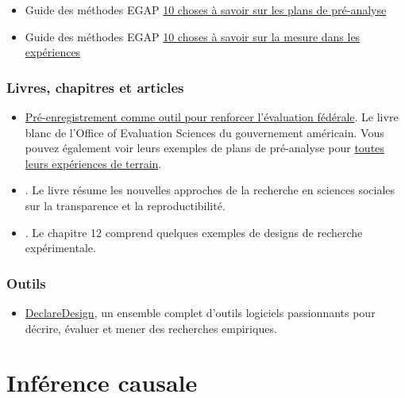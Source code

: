 \documentclass[
  12pt,
]{book}
\providecommand{\tightlist}{%
  \setlength{\itemsep}{0pt}\setlength{\parskip}{0pt}}
\begin{document}
\begin{itemize}
\item
  Guide des méthodes EGAP \href{https://egap.org/resource/10-things-to-know-about-pre-analysis-plans/}{10 choses à savoir sur les plans de pré-analyse}
\item
  Guide des méthodes EGAP \href{https://egap.org/resource/10-things-to-know-about-measurement-in-experiments/}{10 choses à savoir sur la mesure dans les expériences}
\end{itemize}

\hypertarget{livres-chapitres-et-articles}{%
\subsection{Livres, chapitres et articles}\label{livres-chapitres-et-articles}}

\begin{itemize}
\item
  \href{https://oes.gsa.gov/assets/files/preregistration-as-a-tool-in-federal-evaluation.pdf}{Pré-enregistrement comme outil pour renforcer l'évaluation fédérale}. Le livre blanc de l'Office of Evaluation Sciences du gouvernement américain. Vous pouvez également voir leurs exemples de plans de pré-analyse pour \href{https://oes.gsa.gov/work/}{toutes leurs expériences de terrain}.
\item
  \autocite{christensen_transparent_2019}. Le livre résume les nouvelles approches de la recherche en sciences sociales sur la transparence et la reproductibilité.
\item
  \autocite{gerber_field_2012}. Le chapitre 12 comprend quelques exemples de designs de recherche expérimentale.
\end{itemize}

\hypertarget{outils}{%
\subsection{Outils}\label{outils}}

\begin{itemize}
\tightlist
\item
  \href{https://declaredesign.org/}{DeclareDesign}, un ensemble complet d'outils logiciels passionnants pour décrire, évaluer et mener des recherches empiriques.
\end{itemize}

\hypertarget{infuxe9rence-causale}{%
\chapter{Inférence causale}\label{infuxe9rence-causale}}
\end{document}

